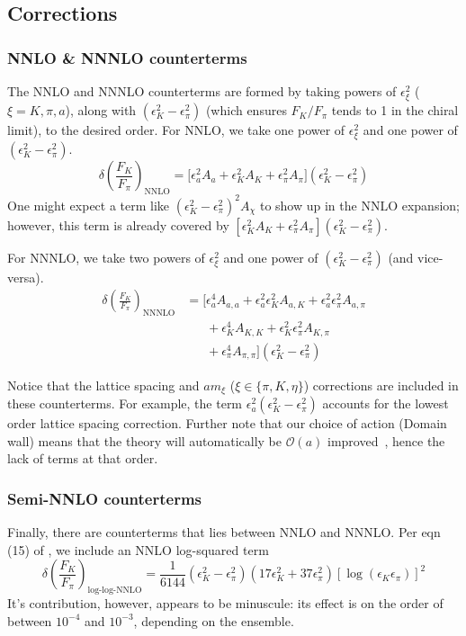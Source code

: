 \documentclass[prd,tightenlines,preprintnumbers,showpacs,superscriptaddress,notitlepage,eqsecnum,floatfix,notitlepage]{revtex4-1}
\begin{document}
\subsection{Corrections}

\subsubsection{NNLO \& NNNLO counterterms}
The NNLO and NNNLO counterterms are formed by taking powers of $\epsilon^2_\xi$ ($\xi = K, \pi, a$), along with $(\epsilon_K^2 - \epsilon_\pi^2)$ (which ensures $F_K / F_\pi$ tends to 1 in the chiral limit), to the desired order. For NNLO, we take one power of $\epsilon^2_\xi$ and one power of $(\epsilon_K^2 - \epsilon_\pi^2)$.
\begin{equation}
\delta\left(\frac{F_K}{F_\pi}\right)_\text{NNLO} = \bigg[
\epsilon_a^2  A_{a}
+\epsilon_K^2  A_{K}
+\epsilon_\pi^2  A_{\pi}
\bigg] (\epsilon_K^2 - \epsilon_\pi^2)
\end{equation}
One might expect a term like $(\epsilon_K^2 - \epsilon_\pi^2)^2 A_{\chi}$ to show up in the NNLO expansion; however, this term is already covered by $[\epsilon_K^2  A_{K}+\epsilon_\pi^2  A_{\pi}] (\epsilon_K^2 - \epsilon_\pi^2)$.

For NNNLO, we take two powers of $\epsilon^2_\xi$ and one power of $(\epsilon_K^2 - \epsilon_\pi^2)$ (and vice-versa).
\begin{align}
\delta\left(\frac{F_K}{F_\pi}\right)_\text{NNNLO} &= \bigg[
\epsilon_a^4  A_{a, a} + \epsilon_a^2 \epsilon_K^2  A_{a, K} + \epsilon_a^2 \epsilon_\pi^2  A_{a, \pi} \\ \nonumber
&\phantom{[ =} + \epsilon_K^4  A_{K, K} + \epsilon_K^2 \epsilon_\pi^2  A_{K, \pi} \\ \nonumber
&\phantom{[ =} + \epsilon_\pi^4  A_{\pi, \pi} \bigg] (\epsilon_K^2 - \epsilon_\pi^2)
\end{align}

Notice that the lattice spacing and $am_\xi$ ($\xi \in \{\pi, K, \eta\}$) corrections are included in these counterterms. For example, the term $\epsilon^2_a (\epsilon^2_K - \epsilon^2_\pi)$ accounts for the lowest order lattice spacing correction. Further note that our choice of action (Domain wall) means that the theory will automatically be $\mathcal{O}(a)$ improved~\cite{Berkowitz:2017opd}, hence the lack of terms at that order.

\subsubsection{Semi-NNLO counterterms}
Finally, there are counterterms that lies between NNLO and NNNLO. Per eqn (15) of \cite{Beane:2006kx}, we include an NNLO log-squared term
\begin{equation}
\delta\left(\frac{F_K}{F_\pi}\right)_\text{log-log-NNLO} =
\frac{1}{6144} \left( \epsilon_K^2 - \epsilon_\pi^2 \right) \left( 17 \epsilon_K^2 + 37 \epsilon_\pi^2 \right) \left[\log \left(\epsilon_K \epsilon_\pi \right) \right]^2
\end{equation}
It's contribution, however, appears to be minuscule: its effect is on the order of between $10^{-4}$ and $10^{-3}$, depending on the ensemble.
\end{document}
